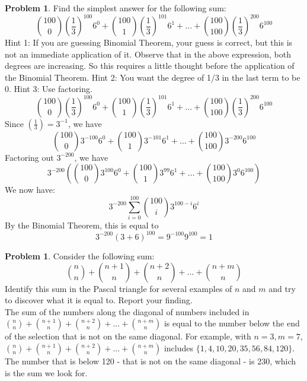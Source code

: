 \documentclass[10pt,leqno ]{article}
\theoremstyle{definition}
\newtheorem{problem}[theorem]{Problem}
\begin{document}
\begin{problem} Find the simplest answer for the following sum: 
$${100 \choose 0} \left(\dfrac{1}{3} \right)^{100} 6^0 + {100 \choose 1} \left(\dfrac{1}{3} \right)^{101} 6^1+. . .+{100 \choose 100} \left(\dfrac{1}{3} \right)^{200} 6^{100}$$
Hint 1:  If you are guessing Binomial Theorem, your guess is correct, but this  is  not  an  immediate  application  of  it.   Observe  that  in  the  above expression, both degrees are increasing.  So this requires a little thought before the application of the Binomial Theorem.  Hint 2:  You want the degree of 1/3 in the last term to be 0.  Hint 3:  Use factoring.
\\
\Large
$${100 \choose 0} \left(\dfrac{1}{3} \right)^{100} 6^0 + {100 \choose 1} \left(\dfrac{1}{3} \right)^{101} 6^1+. . .+{100 \choose 100} \left(\dfrac{1}{3} \right)^{200} 6^{100}$$
Since $(\frac{1}{3}) = 3^{-1}$, we have
$${100 \choose 0} 3^{-100} 6^0 + {100 \choose 1} 3^{-101} 6^1+ \dots +{100 \choose 100} 3^{-200} 6^{100}$$
Factoring out $3^{-200}$, we have
$$3^{-200} \left( {100 \choose 0} 3^{100} 6^0 + {100 \choose 1} 3^{99} 6^1+ \dots +{100 \choose 100} 3^{0} 6^{100} \right)$$
We now have:
$$3^{-200}\sum_{i=0}^{100} {100 \choose i} 3^{100-i}6^i$$
By the Binomial Theorem, this is equal to 
$$3^{-200}(3 + 6)^{100} = 9^{-100} 9 ^{100} = 1$$
\end{problem}
\newpage

\begin{problem} Consider the following sum:
$${n \choose n}+ {n+ 1 \choose n}+ {n+ 2 \choose n}+. . .+{n+m \choose n}$$
Identify this sum in the Pascal triangle for several examples of $n$ and $m$ and try to discover what it is equal to.  Report your finding.
\\
\Large
The sum of the numbers along the diagonal of numbers included in ${n \choose n}+ {n+ 1 \choose n}+ {n+ 2 \choose n}+. . .+{n+m \choose n}$ is equal to the number below the end of the selection that is not on the same diagonal.  For example, with $n=3, m=7$, ${n \choose n}+ {n+ 1 \choose n}+ {n+ 2 \choose n}+. . .+{n+m \choose n}$ includes $\{1, 4, 10, 20, 35, 56, 84, 120\}$.  The number that is below 120 - that is not on the same diagonal - is 230, which is the sum we look for.
\end{problem}
\newpage
\end{document}
